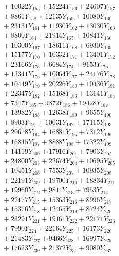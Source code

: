 \documentclass[a4paper,10pt]{article}
\begin{document}
{\begin{align}
&\;  + 10022 Y_{155} + 15224 Y_{156} + 24607 Y_{157} \\[0.3ex]
&\;  + 8861 Y_{158} + 12135 Y_{159} + 10080 Y_{160} \\[0.3ex]
&\;  + 23131 Y_{161} + 11930 Y_{162} + 13030 Y_{163} \\[0.3ex]
&\;  + 8800 Y_{164} + 21914 Y_{165} + 10841 Y_{166} \\[0.3ex]
&\;  + 10300 Y_{167} + 18611 Y_{168} + 6930 Y_{169} \\[0.3ex]
&\;  + 15177 Y_{170} + 10332 Y_{171} + 13401 Y_{172} \\[0.3ex]
&\;  + 23166 Y_{173} + 6684 Y_{174} + 9153 Y_{175} \\[0.3ex]
&\;  + 13341 Y_{176} + 10064 Y_{177} + 24176 Y_{178} \\[0.5ex]\allowbreak
&\;  + 10449 Y_{179} + 20226 Y_{180} + 10436 Y_{181} \\[0.3ex]
&\;  + 22347 Y_{182} + 15168 Y_{183} + 13141 Y_{184} \\[0.3ex]
&\;  + 7347 Y_{185} + 9872 Y_{186} + 19428 Y_{187} \\[0.3ex]
&\;  + 13982 Y_{188} + 12638 Y_{189} + 9655 Y_{190} \\[0.3ex]
&\;  + 8903 Y_{191} + 10031 Y_{192} + 17115 Y_{193} \\[0.3ex]
&\;  + 20618 Y_{194} + 16881 Y_{195} + 7312 Y_{196} \\[0.3ex]
&\;  + 16845 Y_{197} + 8888 Y_{198} + 17322 Y_{199} \\[0.3ex]
&\;  + 14119 Y_{200} + 17916 Y_{201} + 7903 Y_{202} \\[0.3ex]
&\;  + 24800 Y_{203} + 22674 Y_{204} + 10695 Y_{205} \\[0.3ex]
&\;  + 10451 Y_{206} + 7553 Y_{207} + 10935 Y_{208} \\[0.5ex]\allowbreak
&\;  + 22191 Y_{209} + 19700 Y_{210} + 18834 Y_{211} \\[0.3ex]
&\;  + 19960 Y_{212} + 9814 Y_{213} + 7953 Y_{214} \\[0.3ex]
&\;  + 22177 Y_{215} + 15363 Y_{216} + 8996 Y_{217} \\[0.3ex]
&\;  + 15376 Y_{218} + 12465 Y_{219} + 8724 Y_{220} \\[0.3ex]
&\;  + 23291 Y_{221} + 19161 Y_{222} + 22171 Y_{223} \\[0.3ex]
&\;  + 7990 Y_{224} + 22164 Y_{225} + 16173 Y_{226} \\[0.3ex]
&\;  + 21483 Y_{227} + 9466 Y_{228} + 16997 Y_{229} \\[0.3ex]
&\;  + 17623 Y_{230} + 21372 Y_{231} + 9080 Y_{232} \\[0.3ex]

\end{align}}
\end{document}
